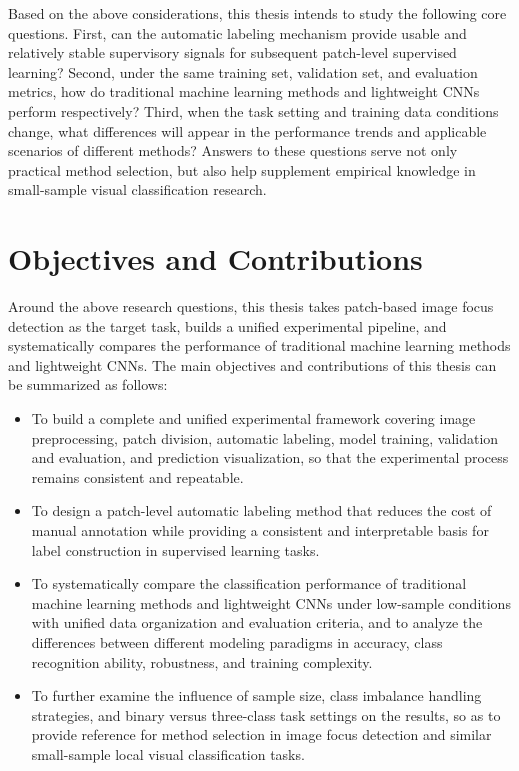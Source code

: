 \par Based on the above considerations, this thesis intends to study the
following core questions. First, can the automatic labeling mechanism provide
usable and relatively stable supervisory signals for subsequent patch-level
supervised learning? Second, under the same training set, validation set, and
evaluation metrics, how do traditional machine learning methods and lightweight
CNNs perform respectively? Third, when the task setting and training data
conditions change, what differences will appear in the performance trends and
applicable scenarios of different methods? Answers to these questions serve not
only practical method selection, but also help supplement empirical knowledge
in small-sample visual classification research.

\section{Objectives and Contributions}

\par Around the above research questions, this thesis takes patch-based image
focus detection \cite{Hou_2016_CVPR} as the target task, builds a unified
experimental pipeline, and systematically compares the performance of
traditional machine learning methods and lightweight CNNs. The main objectives
and contributions of this thesis can be summarized as follows:

\begin{itemize}
    \item To build a complete and unified experimental framework covering image
          preprocessing, patch division, automatic labeling, model training,
          validation and evaluation, and prediction visualization, so that the
          experimental process remains consistent and repeatable.

    \item To design a patch-level automatic labeling method that reduces the
          cost of manual annotation while providing a consistent and
          interpretable basis for label construction in supervised learning
          tasks.

    \item To systematically compare the classification performance of
          traditional machine learning methods \cite{murphy2022pml} and
          lightweight CNNs under low-sample conditions with unified data
          organization and evaluation criteria, and to analyze the differences
          between different modeling paradigms in accuracy, class recognition
          ability, robustness, and training complexity.

    \item To further examine the influence of sample size, class imbalance
          handling strategies, and binary versus three-class task settings on
          the results, so as to provide reference for method selection in image
          focus detection and similar small-sample local visual classification
          tasks.
\end{itemize}

